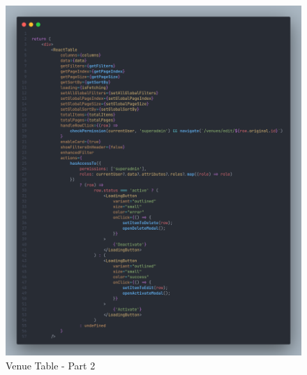 \begin{justify}
\begin{itemize}
\begin{itemize}
                        \begin{figure}[H]
                            \centerline{\includegraphics[width=150mm,scale=1]{figures/implementation_and_testing/implementation/frontend/table-2.png}}
                            \caption{Venue Table - Part 2}
                        \end{figure}
            

\end{itemize}
\end{itemize}
\end{justify}
